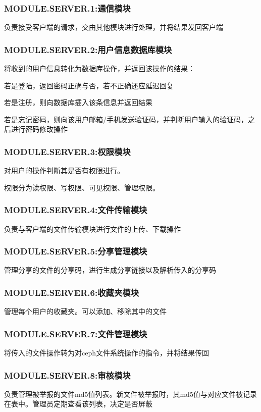 \subsubsection{MODULE.SERVER.1:通信模块}
负责接受客户端的请求，交由其他模块进行处理，并将结果发回客户端

\subsubsection{MODULE.SERVER.2:用户信息数据库模块}
将收到的用户信息转化为数据库操作，并返回该操作的结果：

若是登陆，返回密码正确与否，若不正确还应延迟回复

若是注册，则向数据库插入该条信息并返回结果

若是忘记密码，则向该用户邮箱/手机发送验证码，并判断用户输入的验证码，之后进行密码修改操作

\subsubsection{MODULE.SERVER.3:权限模块}
对用户的操作判断其是否有权限进行。

权限分为读权限、写权限、可见权限、管理权限。

\subsubsection{MODULE.SERVER.4:文件传输模块}
负责与客户端的文件传输模块进行文件的上传、下载操作

\subsubsection{MODULE.SERVER.5:分享管理模块}
管理分享的文件的分享码，进行生成分享链接以及解析传入的分享码

\subsubsection{MODULE.SERVER.6:收藏夹模块}
管理每个用户的收藏夹。可以添加、移除其中的文件

\subsubsection{MODULE.SERVER.7:文件管理模块}

将传入的文件操作转为对ceph文件系统操作的指令，并将结果传回

\subsubsection{MODULE.SERVER.8:审核模块} 
负责管理被举报的文件md5值列表。新文件被举报时，其md5值与对应文件被记录在表中。管理员定期查看该列表，决定是否屏蔽

